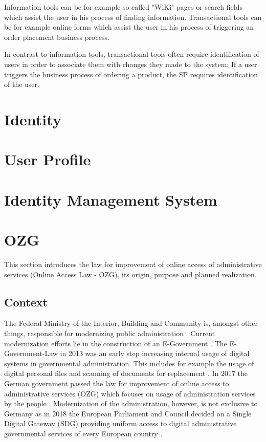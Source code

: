 \documentclass[
     12pt,         %
     a4paper,      %
     BCOR=10mm,version=first,     %
     DIV=14,version=first,        %
     ]{scrreprt}
\begin{document}
Information tools can be for example so called "WiKi" pages or search fields which assist the user in his process of finding information. Transactional tools can be for example online forms which assist the user in his process of triggering an order placement business process.

In contrast to information tools, transactional tools often require identification of users in order to associate them with changes they made to the system: If a user triggers the business process of ordering a product, the SP requires identification of the user.

\section{Identity}

\section{User Profile}

\section{Identity Management System}

\section{OZG}

This section introduces the law for improvement of online access of administrative services (Online Access Law - OZG), its origin, purpose and planned realization.

\subsection{Context}

The Federal Ministry of the Interior, Building and Community is, amongst other things, responsible for modernizing public administration \cite{BMI:Moderne_Verwaltung}. Current modernization efforts lie in the construction of an E-Government \cite{BMI:Behoerdengaenge}.
The E-Government-Law in 2013 was an early step increasing internal usage of digital systems in governmental administration. This includes for example the usage of digital personal files and scanning of documents for replacement \cite{BMI:E-Government_Gesetz}. 
In 2017 the German government passed the law for improvement of online access to administrative services (OZG) which focuses on usage of administration services by the people \cite{BMI:Onlinezugangsgesetz}. 
Modernization of the administration, however, is not exclusive to Germany as in 2018 the European Parliament and Council decided on a Single Digital Gateway (SDG) providing uniform access to digital administrative governmental services of every European country \cite{BMI:Single_Digital_Gateway}.
\end{document}
